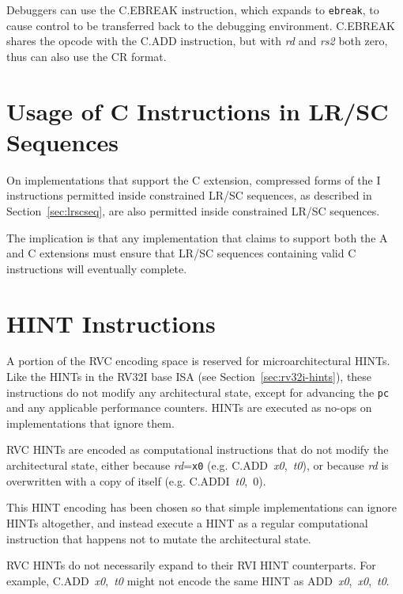 Debuggers can use the C.EBREAK instruction, which expands to {\tt ebreak},
to cause control to be transferred back to the debugging environment.
C.EBREAK shares the opcode with the C.ADD instruction, but with {\em
  rd} and {\em rs2} both zero, thus can also use the CR format.

\section{Usage of C Instructions in LR/SC Sequences}

On implementations that support the C extension, compressed forms of the
I instructions permitted inside constrained LR/SC sequences, as described in
Section~\ref{sec:lrscseq}, are also permitted inside constrained LR/SC
sequences.

\begin{commentary}
The implication is that any implementation that claims to support both
the A and C extensions must ensure that LR/SC sequences containing
valid C instructions will eventually complete.
\end{commentary}

\section{HINT Instructions}
\label{sec:rvc-hints}

A portion of the RVC encoding space is reserved for microarchitectural HINTs.
Like the HINTs in the RV32I base ISA (see Section~\ref{sec:rv32i-hints}),
these instructions do not modify any architectural state, except for advancing
the {\tt pc} and any applicable performance counters.  HINTs are
executed as no-ops on implementations that ignore them.

RVC HINTs are encoded as computational instructions that do not modify the
architectural state, either because {\em rd}={\tt x0}
(e.g. \mbox{C.ADD {\em x0}, {\em t0}}), or because {\em rd} is overwritten
with a copy of itself (e.g. \mbox{C.ADDI {\em t0}, 0}).

\begin{commentary}
This HINT encoding has been chosen so that simple implementations can ignore
HINTs altogether, and instead execute a HINT as a regular computational
instruction that happens not to mutate the architectural state.
\end{commentary}

RVC HINTs do not necessarily expand to their RVI HINT counterparts.  For
example, \mbox{C.ADD {\em x0}, {\em t0}} might not encode the same HINT
as \mbox{ADD {\em x0}, {\em x0}, {\em t0}}.

